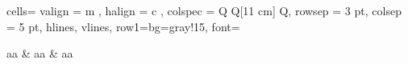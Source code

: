 \begin{longtblr}[
    caption = {esto es el titulo de la tabla},
    label = {tab:etiqueta_para_referenciar}
    ]{
        cells={ valign = m , halign = c }, 
        colspec = {Q Q[11 cm] Q}, 
        rowsep = 3 pt, 
        colsep = 5 pt,           
        hlines, vlines,                             
        row{1}={bg=gray!15, font=\bfseries}
    }

        aa & aa & aa \\

\end{longtblr}

\begingroup {}
\endgroup